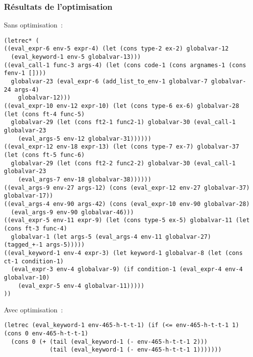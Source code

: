 \documentclass[mathserif]{beamer}
\begin{document}
\begin{frame}[fragile]
\frametitle{Résultats de l'optimisation}
Sans optimisation~: \\
{\tiny
\begin{lstlisting}[language=L]
(letrec* (
((eval_expr-6 env-5 expr-4) (let (cons type-2 ex-2) globalvar-12
  (eval_keyword-1 env-5 globalvar-13)))
((eval_call-1 func-3 args-4) (let (cons code-1 (cons argnames-1 (cons fenv-1 [])))
  globalvar-23 (eval_expr-6 (add_list_to_env-1 globalvar-7 globalvar-24 args-4)
    globalvar-12)))
((eval_expr-10 env-12 expr-10) (let (cons type-6 ex-6) globalvar-28 (let (cons ft-4 func-5)
  globalvar-29 (let (cons ft2-1 func2-1) globalvar-30 (eval_call-1 globalvar-23
    (eval_args-5 env-12 globalvar-31))))))
((eval_expr-12 env-18 expr-13) (let (cons type-7 ex-7) globalvar-37 (let (cons ft-5 func-6)
  globalvar-29 (let (cons ft2-2 func2-2) globalvar-30 (eval_call-1 globalvar-23
    (eval_args-7 env-18 globalvar-38))))))
((eval_args-9 env-27 args-12) (cons (eval_expr-12 env-27 globalvar-37) globalvar-17))
((eval_args-4 env-90 args-42) (cons (eval_expr-10 env-90 globalvar-28)
  (eval_args-9 env-90 globalvar-46)))
((eval_expr-5 env-11 expr-9) (let (cons type-5 ex-5) globalvar-11 (let (cons ft-3 func-4)
  globalvar-1 (let args-5 (eval_args-4 env-11 globalvar-27) (tagged_+-1 args-5)))))
((eval_keyword-1 env-4 expr-3) (let keyword-1 globalvar-8 (let (cons ct-1 condition-1)
  (eval_expr-3 env-4 globalvar-9) (if condition-1 (eval_expr-4 env-4 globalvar-10)
    (eval_expr-5 env-4 globalvar-11)))))
))
\end{lstlisting}
}
Avec optimisation~: \\
{\tiny
\begin{lstlisting}[language=L]
(letrec (eval_keyword-1 env-465-h-t-t-1) (if (<= env-465-h-t-t-1 1) (cons 0 env-465-h-t-t-1)
  (cons 0 (+ (tail (eval_keyword-1 (- env-465-h-t-t-1 2)))
             (tail (eval_keyword-1 (- env-465-h-t-t-1 1)))))))
\end{lstlisting}
}
\end{frame}
\end{document}
